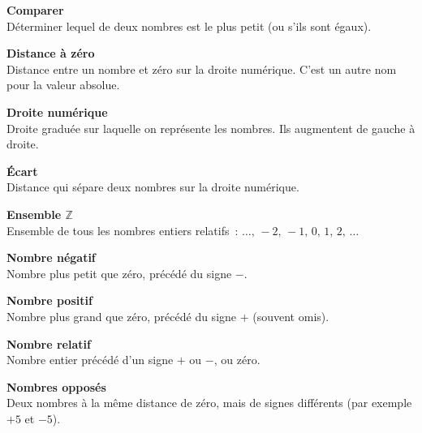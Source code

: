 \begin{tcbraster}[raster columns=2, raster equal height, raster valign=top,raster column skip=2mm, raster row skip=2mm]
\begin{terme}
\textbf{\large Comparer}\\[2pt]
{\small Déterminer lequel de deux nombres est le plus petit (ou s'ils sont égaux).}
\end{terme}
\begin{terme}
\textbf{\large Distance à zéro}\\[2pt]
{\small Distance entre un nombre et zéro sur la droite numérique. C'est un autre nom pour la valeur absolue.}
\end{terme}
\begin{terme}
\textbf{\large Droite numérique}\\[2pt]
{\small Droite graduée sur laquelle on représente les nombres. Ils augmentent de gauche à droite.}
\end{terme}
\begin{terme}
\textbf{\large Écart}\\[2pt]
{\small Distance qui sépare deux nombres sur la droite numérique.}
\end{terme}
\begin{terme}
\textbf{\large Ensemble $\mathbb{Z}$}\\[2pt]
{\small Ensemble de tous les nombres entiers relatifs~: $\ldots,\,-2,\,-1,\,0,\,1,\,2,\,\ldots$}
\end{terme}
\begin{terme}
\textbf{\large Nombre négatif}\\[2pt]
{\small Nombre plus petit que zéro, précédé du signe $-$.}
\end{terme}
\begin{terme}
\textbf{\large Nombre positif}\\[2pt]
{\small Nombre plus grand que zéro, précédé du signe $+$ (souvent omis).}
\end{terme}
\begin{terme}
\textbf{\large Nombre relatif}\\[2pt]
{\small Nombre entier précédé d'un signe $+$ ou $-$, ou zéro.}
\end{terme}
\begin{terme}
\textbf{\large Nombres opposés}\\[2pt]
{\small Deux nombres à la même distance de zéro, mais de signes différents (par exemple $+5$ et $-5$).}
\end{terme}
\begin{terme}

\end{terme}
\end{tcbraster}
